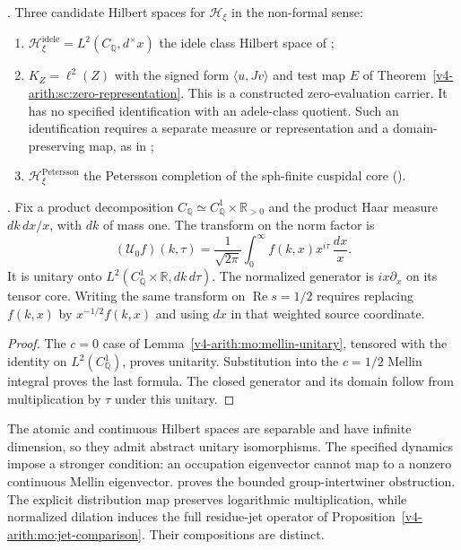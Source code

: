 \begin{definition}
\label{v4-arith:w9-r4:def:target-completion}
\ClaimStatusDefinitional. Three candidate Hilbert spaces for
\(\mathcal{H}_{\xi}\) in the non-formal sense:
\begin{enumerate}
\item \(\mathcal{H}_{\xi}^{\mathrm{idele}}=L^{2}(C_{\mathbb{Q}},d^{\times}x)\)
the idele class Hilbert space of
;
\item $K_Z=\ell^2(Z)$ with the signed form $\langle u,Jv\rangle$
and test map $E$ of Theorem~\ref{v4-arith:sc:zero-representation}.
This is a constructed zero-evaluation carrier. It has no specified
identification with an adele-class quotient. Such an identification
requires a separate measure or representation and a domain-preserving
map, as in ;
\item \(\mathcal{H}_{\xi}^{\mathrm{Petersson}}\) the Petersson
completion of the sph-finite cuspidal core
().
\end{enumerate}
\end{definition}

\begin{lemma}
\label{v4-arith:w9-r4:lem:mellin-on-idele}
\ClaimStatusProvedHereConditional. Fix a product decomposition
$C_{\mathbb Q}\simeq C_{\mathbb Q}^1\times\mathbb R_{>0}$
and the product Haar measure $dk\,dx/x$, with $dk$ of mass one.
The transform on the norm factor is
\[
 (\mathcal U_0f)(k,\tau)=\frac1{\sqrt{2\pi}}
             \int_0^\infty f(k,x)x^{i\tau}\,\frac{dx}{x}.
\]
It is unitary onto $L^2(C_{\mathbb Q}^1\times\mathbb R,dk\,d\tau)$.
The normalized generator is $i x\partial_x$ on its tensor core.
Writing the same transform on $\operatorname{Re}s=1/2$ requires
replacing $f(k,x)$ by $x^{-1/2}f(k,x)$ and using $dx$ in that
weighted source coordinate.
\end{lemma}
\begin{proof}
The $c=0$ case of Lemma~\ref{v4-arith:mo:mellin-unitary}, tensored
with the identity on $L^2(C_{\mathbb Q}^1)$, proves unitarity.
Substitution into the $c=1/2$ Mellin integral proves the last formula.
The closed generator and its domain follow from multiplication
by $\tau$ under this unitary.
\end{proof}

\begin{remark}
\label{v4-arith:w9-r4:rem:completion-mismatch}
The atomic and continuous Hilbert spaces are separable and have
infinite dimension, so they admit abstract unitary isomorphisms.
The specified dynamics impose a stronger condition: an occupation
eigenvector cannot map to a nonzero continuous Mellin eigenvector.
 proves
the bounded group-intertwiner obstruction. The explicit distribution
map preserves logarithmic multiplication, while normalized dilation
induces the full residue-jet operator of
Proposition~\ref{v4-arith:mo:jet-comparison}. Their compositions are distinct.
\end{remark}

